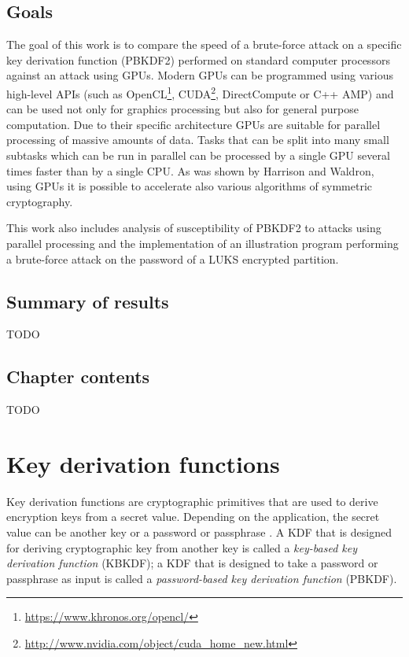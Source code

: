 \documentclass[12pt,oneside]{fithesis2}
\begin{document}
      \section{Goals}
      The goal of this work is to compare the speed of a brute-force attack on a specific key derivation function (PBKDF2) performed on standard computer processors against an attack using GPUs. Modern GPUs can be programmed using various high-level APIs (such as OpenCL\footnote{\url{https://www.khronos.org/opencl/}}, CUDA\footnote{\url{http://www.nvidia.com/object/cuda_home_new.html}}, DirectCompute or C++ AMP) and can be used not only for graphics processing but also for general purpose computation. Due to their specific architecture GPUs are suitable for parallel processing of massive amounts of data. Tasks that can be split into many small subtasks which can be run in parallel can be processed by a single GPU several times faster than by a single CPU. As was shown by Harrison and Waldron\cite{Harrison}, using GPUs it is possible to accelerate also various algorithms of symmetric cryptography.
    
      This work also includes analysis of susceptibility of PBKDF2 to attacks using parallel processing and the implementation of an illustration program performing a brute-force attack on the password of a LUKS encrypted partition.
    
      \section{Summary of results}
      TODO
    
      \section{Chapter contents}
      TODO
    
    \chapter{Key derivation functions}
      Key derivation functions are cryptographic primitives that are used to derive encryption keys from a secret value. Depending on the application, the secret value can be another key or a password or passphrase \cite{wikiKDF}. A KDF that is designed for deriving cryptographic key from another key is called a \emph{key-based key derivation function} (KBKDF); a KDF that is designed to take a password or passphrase as input is called a \emph{password-based key derivation function} (PBKDF).
      
\end{document}
